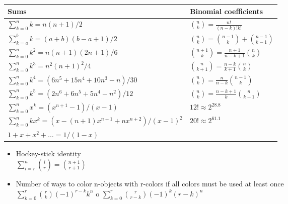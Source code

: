 {\renewcommand{\arraystretch}{2}
\begin{tabular}{|l| l|}
	\hline
	Sums & Binomial coefficients \\
	\hline
    $\sum_{k=0}^n k = n(n+1)/2$ & ${n \choose k} = \frac{n!}{(n-k)!k!}$  \\
	\hline
    $\sum_{k=a}^b k = (a+b)(b-a+1)/2$ & ${n \choose k} = {n-1 \choose k} + {n-1 \choose k-1}$ \\
	\hline
    $\sum_{k=0}^n k^2 = n(n+1)(2n+1)/6$ & ${n+1 \choose k} = \frac{n+1}{n-k+1} {n \choose k}$  \\
	\hline
    $\sum_{k=0}^n k^3 = n^2(n+1)^2/4$ & ${n \choose k+1} = \frac{n-k}{k+1} {n \choose k}$     \\
	\hline
    $\sum_{k=0}^n k^4 = (6n^5 + 15n^4 + 10n^3 - n)/30$ & ${n \choose k} = \frac{n}{n-k} {n-1 \choose k}$      \\
	\hline
    $\sum_{k=0}^n k^5 = (2n^6 + 6n^5 + 5n^4 - n^2)/12$ & ${n \choose k} = \frac{n-k+1}{k} {n \choose k-1}$    \\
	\hline
    $\sum_{k=0}^n x^k = (x^{n+1} - 1)/(x - 1)$ & $12! \approx 2^{28.8}$ \\
	\hline
    $\sum_{k=0}^n kx^k = (x - (n+1)x^{n+1} + nx^{n+2})/(x-1)^2$ & $20! \approx 2^{61.1}$ \\
	\hline
    $1 + x + x^2 + \dots = 1 / (1 - x)$ & \\
	\hline
\end{tabular}}
\begin{itemize}
\item Hockey-stick identity \\
$\sum_{i=r}^{n}\binom{i}{r} = \binom{n+1}{r+1}$
\item Number of ways to color n-objects with r-colors if all colors must be used at least once \\
$\sum_{k=0}^r {r \choose k}(-1)^{r-k}k^n$ o $\sum_{k=0}^r {r \choose r-k}(-1)^{k}(r-k)^n$
\end{itemize}

